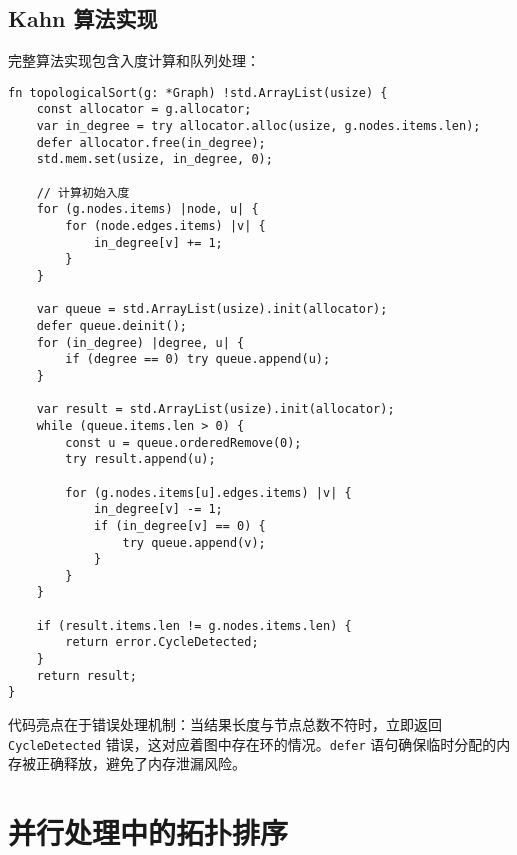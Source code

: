 \section{Kahn 算法实现}
完整算法实现包含入度计算和队列处理：\par
\begin{lstlisting}[language=zig]
fn topologicalSort(g: *Graph) !std.ArrayList(usize) {
    const allocator = g.allocator;
    var in_degree = try allocator.alloc(usize, g.nodes.items.len);
    defer allocator.free(in_degree);
    std.mem.set(usize, in_degree, 0);

    // 计算初始入度
    for (g.nodes.items) |node, u| {
        for (node.edges.items) |v| {
            in_degree[v] += 1;
        }
    }

    var queue = std.ArrayList(usize).init(allocator);
    defer queue.deinit();
    for (in_degree) |degree, u| {
        if (degree == 0) try queue.append(u);
    }

    var result = std.ArrayList(usize).init(allocator);
    while (queue.items.len > 0) {
        const u = queue.orderedRemove(0);
        try result.append(u);

        for (g.nodes.items[u].edges.items) |v| {
            in_degree[v] -= 1;
            if (in_degree[v] == 0) {
                try queue.append(v);
            }
        }
    }

    if (result.items.len != g.nodes.items.len) {
        return error.CycleDetected;
    }
    return result;
}
\end{lstlisting}
代码亮点在于错误处理机制：当结果长度与节点总数不符时，立即返回 \verb!CycleDetected! 错误，这对应着图中存在环的情况。\verb!defer! 语句确保临时分配的内存被正确释放，避免了内存泄漏风险。\par
\chapter{并行处理中的拓扑排序}
